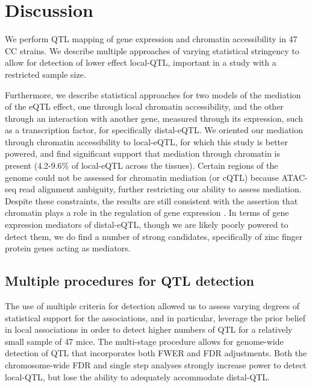 \section{Discussion}

We perform QTL mapping of gene expression and chromatin accessibility in 47 CC strains. We describe multiple approaches of varying statistical stringency to allow for detection of lower effect local-QTL, important in a study with a restricted sample size. 

Furthermore, we describe statistical approaches for two models of the mediation of the eQTL effect, one through local chromatin accessibility, and the other through an interaction with another gene, measured through its expression, such as a transcription factor, for specifically distal-eQTL. We oriented our mediation through chromatin accessibility to local-eQTL, for which this study is better powered, and find significant support that mediation through chromatin is present (4.2-9.6\% of local-eQTL across the tissues). Certain regions of the genome could not be assessed for chromatin mediation (or cQTL) because ATAC-seq read alignment ambiguity, further restricting our ability to assess mediation. Despite these constraints, the results are still consistent with the assertion that chromatin plays a role in the regulation of gene expression \citep{Klemm2019}. In terms of gene expression mediators of distal-eQTL, though we are likely poorly powered to detect them, we do find a number of strong candidates, specifically of zinc finger protein genes acting as mediators. 

\subsection{Multiple procedures for QTL detection}

The use of multiple criteria for detection allowed us to assess varying degrees of statistical support for the associations, and in particular, leverage the prior belief in local associations in order to detect higher numbers of QTL for a relatively small sample of 47 mice. The multi-stage procedure allows for genome-wide detection of QTL that incorporates both FWER and FDR adjustments. Both the chromosome-wide FDR and single step analyses strongly increase power to detect local-QTL, but lose the ability to adequately accommodate distal-QTL.



